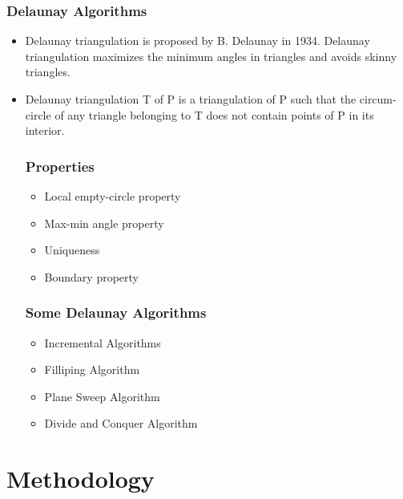 \documentclass[conference]{IEEEtran}
\begin{document}
    \subsubsection{\textbf{Delaunay Algorithms}}
    \begin{itemize}
        \item Delaunay triangulation is proposed by B. Delaunay in 1934. Delaunay triangulation maximizes the minimum angles in triangles and avoids skinny triangles.
        \item Delaunay triangulation T of P is a triangulation of P such that the circum-circle of any triangle belonging to T does not contain points of P in its interior.
        \subsubsection{Properties}
        \begin{itemize}
            \item Local empty-circle property
            \item Max-min angle property
            \item Uniqueness
            \item Boundary property
        \end{itemize}
        \subsubsection{Some Delaunay Algorithms}
        \begin{itemize}
            \item Incremental Algorithms
            \item Filliping Algorithm
            \item Plane Sweep Algorithm
            \item Divide and Conquer Algorithm
        \end{itemize}
    \end{itemize}

\section{Methodology}
\end{document}
